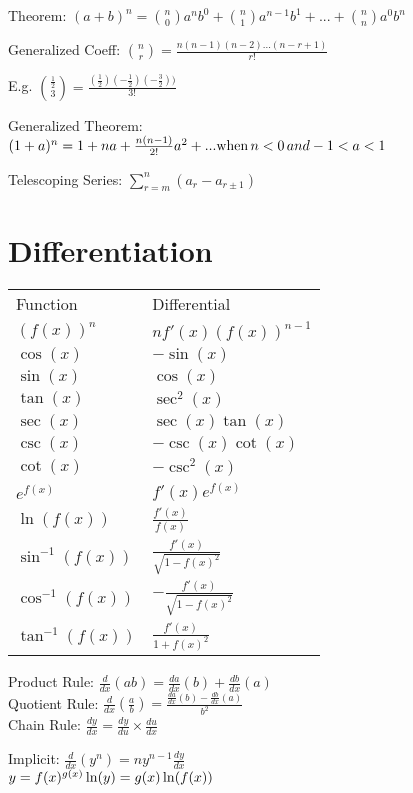 \documentclass[a4paper,twoside,notitlepage,10pt]{article}
\begin{document}
\begin{landscape}
\begin{multicols}{3}
Theorem: $(a+b)^n = \binom{n}{0}a^{n}b^{0} + \binom{n}{1}a^{n-1}b^{1} + ...+ \binom{n}{n}a^{0}b^{n}$

Generalized Coeff: $\binom{n}{r} = \frac{n(n-1)(n-2)...(n-r+1)}{r!}$

E.g. $\binom{\frac{1}{2}}{3} = \frac{(\frac{1}{2})(-\frac{1}{2})(-\frac{3}{2}))}{3!}$

Generalized Theorem: $(1+a)^n = 1+na+\frac{n(n-1)}{2!}a^2 + ...\,\\
\text{when}\, n < 0 \text\,{and} -1 < a < 1$

Telescoping Series: $\sum^n_{r=m}(a_r - a_{r\pm1})$


\section{Differentiation}
\renewcommand{\arraystretch}{1.2}

\begin{tabular}{l| l}
  Function & Differential\\
  $(f(x))^n$ & $nf'(x)(f(x))^{n-1}$\\
  $\cos(x)$ & $-\sin(x)$\\
  $\sin(x)$ & $\cos(x)$\\
  $\tan(x)$ & $\sec^2(x)$\\
  $\sec(x)$ & $\sec(x)\tan(x)$\\
  $\csc(x)$ & $-\csc(x)\cot(x)$\\
  $\cot(x)$ & $-\csc^2(x)$\\
  $e^{f(x)}$ & $f'(x)e^{f(x)}$\\
  $\ln(f(x))$ & $\frac{f'(x)}{f(x)}$\\
  $\sin^{-1}(f(x))$ & $\frac{f'(x)}{\sqrt{1-f(x)^2}}$\\
  $\cos^{-1}(f(x))$ & $-\frac{f'(x)}{\sqrt{1-f(x)^2}}$\\
  $\tan^{-1}(f(x))$ & $\frac{f'(x)}{1+f(x)^2}$\\
\end{tabular}

Product Rule: $\frac{d}{dx}(ab) = \frac{da}{dx}(b) + \frac{db}{dx}(a)$\\
Quotient Rule: $\frac{d}{dx}(\frac{a}{b}) = \frac{\frac{da}{dx}(b) - \frac{db}{dx}(a)}{b^2}$\\
Chain Rule: $\frac{dy}{dx} = \frac{dy}{du} \times \frac{du}{dx}$

Implicit: $\frac{d}{dx}(y^n) = ny^{n-1}\frac{dy}{dx}$\\
$y=f(x)^{g(x)}\\
\ln(y) = g(x)\ln(f(x))$


\end{multicols}
\end{landscape}
\end{document}
